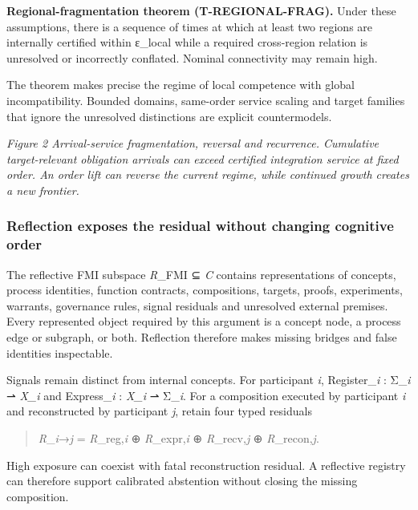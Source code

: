\textbf{Regional-fragmentation theorem (T-REGIONAL-FRAG).} Under these
assumptions, there is a sequence of times at which at least two regions
are internally certified within ε\_local while a required cross-region
relation is unresolved or incorrectly conflated. Nominal connectivity
may remain high.

The theorem makes precise the regime of local competence with global
incompatibility. Bounded domains, same-order service scaling and target
families that ignore the unresolved distinctions are explicit
countermodels.

\emph{Figure 2 \textbar{} Arrival-service fragmentation, reversal and
recurrence. Cumulative target-relevant obligation arrivals can exceed
certified integration service at fixed order. An order lift can reverse
the current regime, while continued growth creates a new frontier.}

\hypertarget{reflection-exposes-the-residual-without-changing-cognitive-order}{%
\subsubsection{Reflection exposes the residual without changing
cognitive
order}\label{reflection-exposes-the-residual-without-changing-cognitive-order}}

The reflective FMI subspace \emph{R}\_FMI ⊆ \emph{C} contains
representations of concepts, process identities, function contracts,
compositions, targets, proofs, experiments, warrants, governance rules,
signal residuals and unresolved external premises. Every represented
object required by this argument is a concept node, a process edge or
subgraph, or both. Reflection therefore makes missing bridges and false
identities inspectable.

Signals remain distinct from internal concepts. For participant
\emph{i}, Register\_\emph{i} : Σ\_\emph{i} ⇀ \emph{X\_i} and
Express\_\emph{i} : \emph{X\_i} ⇀ Σ\_\emph{i}. For a composition
executed by participant \emph{i} and reconstructed by participant
\emph{j}, retain four typed residuals

\begin{quote}
\emph{R}\_\emph{i}→\emph{j} = \emph{R}\_reg,\emph{i} ⊕
\emph{R}\_expr,\emph{i} ⊕ \emph{R}\_recv,\emph{j} ⊕
\emph{R}\_recon,\emph{j}.
\end{quote}

High exposure can coexist with fatal reconstruction residual. A
reflective registry can therefore support calibrated abstention without
closing the missing composition.

